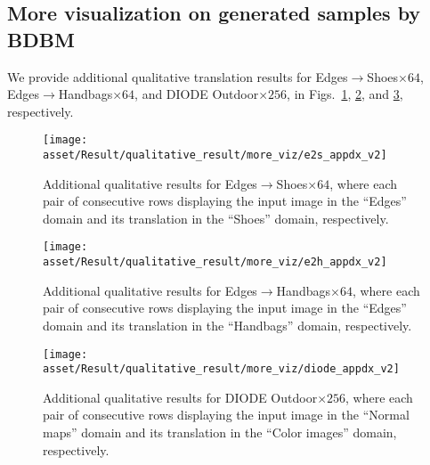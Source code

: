 \subsection{More visualization on generated samples by BDBM}

We provide additional qualitative translation results for Edges$\rightarrow$Shoes$\times64$,
Edges$\rightarrow$Handbags$\times64$, and DIODE Outdoor$\times256$,
in Figs.~\ref{fig:e2s_appdx}, \ref{fig:e2h_appdx}, and \ref{fig:diode_appdx},
respectively.

\newpage{}

\begin{figure}
\begin{centering}
\texttt{[image: asset/Result/qualitative\_result/more\_viz/e2s\_appdx\_v2]}
\par\end{centering}
\caption{Additional qualitative results for Edges$\rightarrow$Shoes$\times64$,
where each pair of consecutive rows displaying the input image in
the ``Edges'' domain and its translation in the ``Shoes'' domain,
respectively.\label{fig:e2s_appdx}}

\end{figure}

\begin{figure}[H]
\begin{centering}
\texttt{[image: asset/Result/qualitative\_result/more\_viz/e2h\_appdx\_v2]}\caption{Additional qualitative results for Edges$\rightarrow$Handbags$\times64$,
where each pair of consecutive rows displaying the input image in
the ``Edges'' domain and its translation in the ``Handbags'' domain,
respectively.\label{fig:e2h_appdx}}
\par\end{centering}
\end{figure}

\begin{figure}[H]
\begin{centering}
\texttt{[image: asset/Result/qualitative\_result/more\_viz/diode\_appdx\_v2]}
\par\end{centering}
\caption{Additional qualitative results for DIODE Outdoor$\times256$, where
each pair of consecutive rows displaying the input image in the ``Normal
maps'' domain and its translation in the ``Color images'' domain,
respectively.\label{fig:diode_appdx}}
\end{figure}

